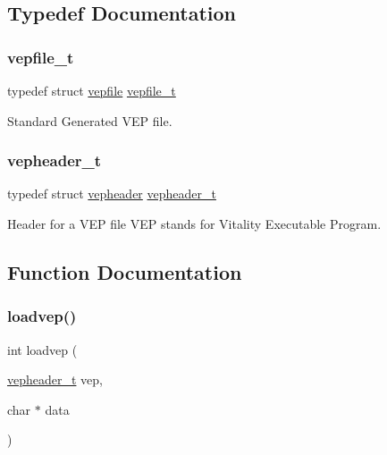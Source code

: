 \subsection{Typedef Documentation}
\mbox{\label{a00089_af285fc2949acac5b7aa6f065c8811960_af285fc2949acac5b7aa6f065c8811960}} 
\subsubsection{\texorpdfstring{vepfile\+\_\+t}{vepfile\_t}}
{\footnotesize\ttfamily typedef struct \hyperlink{a00119}{vepfile}  \hyperlink{a00089_af285fc2949acac5b7aa6f065c8811960_af285fc2949acac5b7aa6f065c8811960}{vepfile\+\_\+t}}



Standard Generated V\+EP file. 

\mbox{\label{a00089_a78392c340e1fe1be344df81d1438b74f_a78392c340e1fe1be344df81d1438b74f}} 
\subsubsection{\texorpdfstring{vepheader\+\_\+t}{vepheader\_t}}
{\footnotesize\ttfamily typedef struct \hyperlink{a00115}{vepheader}  \hyperlink{a00089_a78392c340e1fe1be344df81d1438b74f_a78392c340e1fe1be344df81d1438b74f}{vepheader\+\_\+t}}



Header for a V\+EP file V\+EP stands for Vitality Executable Program. 



\subsection{Function Documentation}
\mbox{\label{a00089_ad5530515939c1e3332746affa700c759_ad5530515939c1e3332746affa700c759}} 
\subsubsection{\texorpdfstring{loadvep()}{loadvep()}}
{\footnotesize\ttfamily int loadvep (\begin{DoxyParamCaption}\item[{\hyperlink{a00089_a78392c340e1fe1be344df81d1438b74f_a78392c340e1fe1be344df81d1438b74f}{vepheader\+\_\+t}}]{vep,  }\item[{char $\ast$}]{data }\end{DoxyParamCaption})}



